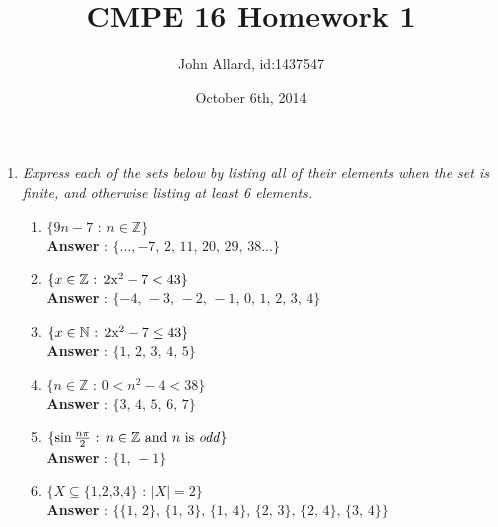 \documentclass[a4paper,11pt]{article}
\title{CMPE 16 Homework 1}
\author{John Allard, id:1437547}
\date{October 6th, 2014}
\begin{document}
\maketitle

\begin{enumerate}

\item \emph{Express each of the sets below by listing all of their elements when the set is finite, and otherwise listing at least 6 elements.}

  \begin{enumerate}
  \item \( \lbrace 9n - 7\text{ : }n \in \mathbb{Z}  \rbrace \) \\
  \textbf{Answer} : \( \lbrace \ldots, -7 \text{, } 2 \text{, } 11 \text{, } 20 \text{, } 29 \text{, } 38 \ldots\rbrace \) 
  \item \( \lbrace x \in \mathbb{Z} \text{ : } 2$x$^2-7 < 43 \rbrace \) \\
  \textbf{Answer} : \( \lbrace -4 \text{, } -3 \text{, } -2 \text{, } -1 \text{, } 0 \text{, } 1 \text{, } 2 \text{, } 3 \text{, } 4  \rbrace \) 
  \item \( \lbrace x \in \mathbb{N} \text{ : } 2$x$^2-7 \leq 43 \rbrace \) \\
  \textbf{Answer} : \( \lbrace 1 \text{, } 2 \text{, } 3 \text{, } 4 \text{, } 5  \rbrace \) 
  \item \( \lbrace n \in \mathbb{Z} \text{ : } 0 < n^2 - 4 < 38 \rbrace \) \\
  \textbf{Answer} : \( \lbrace 3 \text{, } 4 \text{, } 5 \text{, } 6 \text{, } 7 \rbrace \) 
  \item \( \lbrace  \sin{\frac{n\pi}{2}} \text{ : } n \in \mathbb{Z} \text{ and $n$ is \emph{odd}} \rbrace \) \\
  \textbf{Answer} : \( \lbrace 1 \text{, } -1\rbrace \) 
  \item \( \lbrace  X \subseteq \lbrace 1 \text{,} 2 \text{,} 3 \text{,} 4 \rbrace \text{ : } \vert X \vert = 2 \rbrace \) \\
  \textbf{Answer} : \( \lbrace 
  \lbrace 1 \text{, } 2 \rbrace \text{, } 
  \lbrace 1 \text{, } 3 \rbrace \text{, } 
  \lbrace 1 \text{, } 4 \rbrace \text{, } 
  \lbrace 2 \text{, } 3 \rbrace \text{, } 
  \lbrace 2 \text{, } 4 \rbrace \text{, } 
  \lbrace 3 \text{, } 4 \rbrace
  \rbrace \) 


\end{enumerate}
\end{enumerate}
\end{document}
